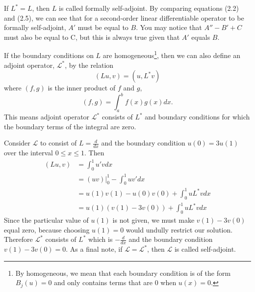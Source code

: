 If \(L^* = L\), then \(L\) is called formally self-adjoint. By comparing equations (2.2) and (2.5), we can see that for a second-order linear differentiable operator to be formally self-adjoint, \(A'\) must be equal to \(B\). You may notice that \(A''-B'+C\) must also be equal to C, but this is always true given that \(A'\) equals \(B\).

\begin{definition}
	If the boundary conditions on \(L\) are homogeneous\footnote{By homogeneous, we mean that each boundary condition is of the form \(B_j(u)=0\) and only contains terms that are 0 when \(u(x)=0\).}, then we can also define an adjoint operator, \(\mathcal{L}^*\), by the relation
	\begin{equation}
		(Lu,v) = (u,L^*v)
	\end{equation}
	where \((f,g)\) is the inner product of \(f\) and \(g\),
	\begin{equation}
		(f,g) = \int_a^bf(x)g(x)dx.
	\end{equation}
	This means adjoint operator \(\mathcal{L}^*\) consists of \(L^*\) and boundary conditions for which the boundary terms of the integral are zero. 
\end{definition}

\begin{example}
	Consider \(\mathcal{L}\) to consist of \(L=\frac{d}{dx}\) and the boundary condition \(u(0)=3u(1)\) over the interval \(0\leq x \leq 1\). Then
	\begin{equation}
		\begin{split}
			(Lu,v) &= \int_0^1u'vdx\\
			       &= (uv)\biggr\rvert_0^1 - \int_0^1 uv'dx\\
			       &= u(1)v(1)-u(0)v(0)+\int_0^1uL^*vdx\\
			       &= u(1)(v(1)-3v(0)) + \int_0^1uL^*vdx
		\end{split}
	\end{equation}
	Since the particular value of \(u(1)\) is not given, we must make \(v(1)-3v(0)\) equal zero, because choosing \(u(1)=0\) would undully restrict our solution. Therefore \(\mathcal{L^*}\) consists of \(L^*\) which is \(-\frac{d}{dx}\) and the boundary condition \(v(1) - 3v(0)=0\). As a final note, if \(\mathcal{L}=\mathcal{L}^*\), then \(\mathcal{L}\) is called self-adjoint.
\end{example}
